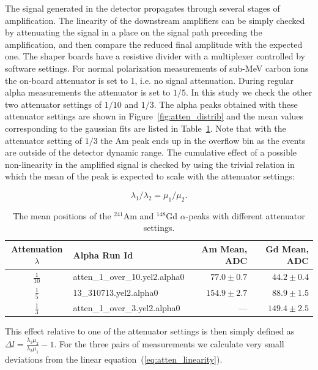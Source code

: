 \documentclass[a4paper,12pt]{article}
\newcommand\americium{${}^{241}$Am}
\newcommand\gadolinium{${}^{148}$Gd}
\begin{document}
The signal generated in the detector propagates through several stages of
amplification. The linearity of the downstream amplifiers can be simply checked
by attenuating the signal in a place on the signal path preceding the
amplification, and then compare the reduced final amplitude with the expected
one. The shaper boards have a resistive divider with a multiplexer controlled by
software settings. For normal polarization measurements of sub-MeV carbon ions
the on-board attenuator is set to 1, i.e. no signal attenuation. During regular
alpha measurements the attenuator is set to $1/5$. In this study we check the
other two attenuator settings of $1/10$ and $1/3$. The alpha peaks obtained with
these attenuator settings are shown in Figure~\ref{fig:atten_distrib} and the
mean values corresponding to the gaussian fits are listed in
Table~\ref{table:atten}. Note that with the attenuator setting of $1/3$ the Am
peak ends up in the overflow bin as the events are outside of the detector
dynamic range. The cumulative effect of a possible non-linearity in the
amplified signal is checked by using the trivial relation in which the mean of
the peak is expected to scale with the attenuator settings:

\begin{equation}
\lambda_1/\lambda_2 = \mu_1/ \mu_2.
\label{eq:atten_linearity}
\end{equation}


\begin{table}[htb]
\caption{The mean positions of the \americium{} and \gadolinium{} $\alpha$-peaks
with different attenuator settings.}
\centering

\begin{tabular}{clrr}
\toprule
Attenuation $\lambda$ & Alpha Run Id      & Am Mean, ADC      & Gd Mean, ADC \\
\midrule
$\frac{1}{10}$  & \small{atten\_1\_over\_10.yel2.alpha0}  & $77.0\pm0.7$      & $44.2\pm0.4$ \\
\addlinespace
$\frac{1}{5}$   & \small{13\_310713.yel2.alpha0}          & $154.9\pm2.7$     & $88.9\pm1.5$ \\
\addlinespace
$\frac{1}{3}$   & \small{atten\_1\_over\_3.yel2.alpha0}   & ---\hspace{20pt}  & $149.4\pm2.5$ \\
\bottomrule
\end{tabular}

\label{table:atten}
\end{table}

\noindent
This effect relative to one of the attenuator settings is then simply defined as
$\Delta l = \frac{\lambda_1 \mu_2}{\lambda_2 \mu_1} - 1$. For the three pairs
of measurements we calculate very small deviations from the linear
equation~(\ref{eq:atten_linearity}).
\end{document}
